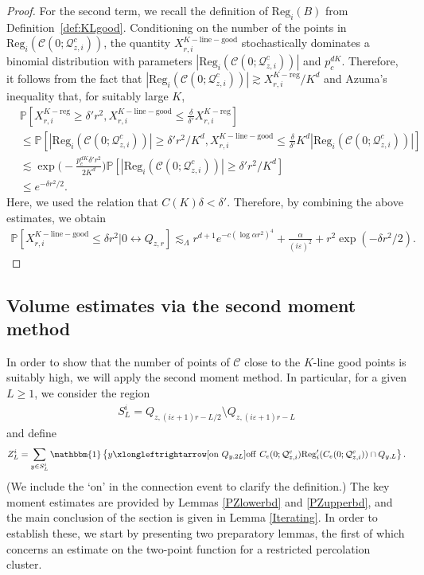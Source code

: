 \documentclass[11pt]{article}
\theoremstyle{definition}
\theoremstyle{remark}
\newcommand{\bP}{\mathbb{P}}
\numberwithin{equation}{section}
\theoremstyle{plain}
\theoremstyle{definition}
\theoremstyle{remark}
\theoremstyle{plain}
\begin{document}
\begin{proof}
For the second term, we recall the definition of $\mathrm{Reg}_i(B)$ from Definition~\ref{def:KLgood}. Conditioning on the number of the points in $\mathrm{Reg}_i(\mathcal C(0; \mathcal Q_{z,i}^c))$, the quantity $X_{r,i}^{K-\mathrm{line-good}}$ stochastically dominates a binomial distribution with parameters $|\mathrm{Reg}_i(\mathcal C(0; \mathcal Q_{z,i}^c))|$ and $p_c^{dK}$.  Therefore, it follows from the fact that $|\mathrm{Reg}_i(\mathcal C(0; \mathcal Q_{z,i}^c))|\gtrsim X_{r,i}^{K-\mathrm{reg}}/K^d$ and Azuma's inequality \cite[Theorem~7.2.1]{AS08} that, for suitably large $K$,
\begin{align*}
      & \bP[X_{r,i}^{K-\mathrm{reg}}\ge \delta'r^2, X_{r,i}^{K-\mathrm{line-good}}\le \frac{\delta}{\delta'} X_{r,i}^{K-\mathrm{reg}}]\\
       &\le \bP[|\mathrm{Reg}_i(\mathcal C(0; \mathcal Q_{z,i}^c))|\ge \delta'r^2/K^d, X_{r,i}^{K-\mathrm{line-good}}\le \frac{\delta}{\delta'}K^d|\mathrm{Reg}_i(\mathcal C(0; \mathcal Q_{z,i}^c))|]\\
       &\lesssim \exp\bigg(-\frac{p_c^{dK} \delta'r^2}{2K^d}\bigg)\bP[|\mathrm{Reg}_i(\mathcal C(0; \mathcal Q_{z,i}^c))|\ge \delta'r^2/K^d]\\
       &\le e^{-\delta r^2/2}.
    \end{align*}
    Here, we used the relation that $C(K)\delta<\delta'$. Therefore, by combining the above estimates, we obtain
    \begin{align*}
      \mathbb {P}[X_{r,i}^{K-\mathrm{line-good}}\le \delta r^2|0 \leftrightarrow Q_{z,r}]\lesssim_{\Lambda}  r^{d+1}e^{-c(\log \alpha r^2)^4}+\frac{\alpha}{(i\varepsilon)^2}+ r^2\exp(-\delta r^2/2).
    \end{align*}
\end{proof}

\subsection{Volume estimates via the second moment method}

In order to show that the number of points of $\mathcal{C}$ close to the $K$-line good points is suitably high, we will apply the second moment method. In particular, for a given $L\geq 1$, we consider the region
\begin{align*}
S_L^i=Q_{z, (i\varepsilon+1)r-L/2}\setminus Q_{z, (i\varepsilon+1)r-L}
\end{align*}
and define
\begin{align}\label{zli}
Z_{L}^i=\sum_{y \in S_L^i}\mathbbm{1}\left\{ y \xlongleftrightarrow[\mathrm{on}~Q_{y,2L}]{\mathrm{off}~C_e(0;\mathcal Q_{z,i}^c)}\mathrm{Reg}_i'(C_e(0;\mathcal Q_{z,i}^c))\cap Q_{y,L}\right\}.
\end{align}
(We include the `on' in the connection event to clarify the definition.) The key moment estimates are provided by Lemmas \ref{PZlowerbd} and \ref{PZupperbd}, and the main conclusion of the section is given in Lemma \ref{Iterating}. In order to establish these, we start by presenting two preparatory lemmas, the first of which concerns an estimate on the two-point function for a restricted percolation cluster.
\end{document}
